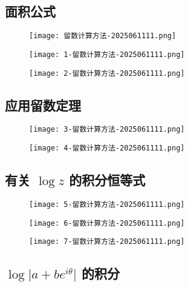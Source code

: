 \subsection{面积公式}

\begin{figure}[H]
\centering
\texttt{[image: 留数计算方法-2025061111.png]}
\label{}
\end{figure}

\begin{figure}[H]
\centering
\texttt{[image: 1-留数计算方法-2025061111.png]}
\label{}
\end{figure}

\begin{figure}[H]
\centering
\texttt{[image: 2-留数计算方法-2025061111.png]}
\label{}
\end{figure}

\subsection{应用留数定理}

\begin{figure}[H]
\centering
\texttt{[image: 3-留数计算方法-2025061111.png]}
\label{}
\end{figure}
\begin{figure}[H]
\centering
\texttt{[image: 4-留数计算方法-2025061111.png]}
\label{}
\end{figure}

\subsection{有关 \texorpdfstring{$\log z$}{log z} 的积分恒等式}

\begin{figure}[H]
\centering
\texttt{[image: 5-留数计算方法-2025061111.png]}
\label{}
\end{figure}
\begin{figure}[H]
\centering
\texttt{[image: 6-留数计算方法-2025061111.png]}
\label{}
\end{figure}
\begin{figure}[H]
\centering
\texttt{[image: 7-留数计算方法-2025061111.png]}
\label{}
\end{figure}

\subsection{\texorpdfstring{$\log \lvert a+be^{ i\theta } \rvert$}{log lvert a+be^ itheta  rvert} 的积分}

